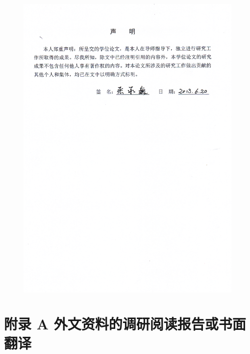 \documentclass[12pt,a4paper]{article}
\begin{document}
\begin{figure}[htbp]
\centering\includegraphics[width=6in]{announcement.png} 

\end{figure}


\clearpage
\section*{附录 A 外文资料的调研阅读报告或书面翻译}

\end{document}

